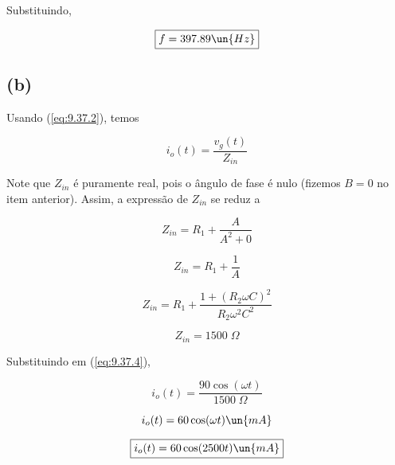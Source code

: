 Substituindo,

\[ \boxed{f = 397.89 \un{Hz}}  \]

\subsection*{(b)}

Usando (\ref{eq:9.37.2}), temos

\begin{equation}\label{eq:9.37.4}
    i_o(t) = \frac{v_g(t)}{Z_{in}}
\end{equation}

Note que $Z_{in}$ é puramente real, pois o ângulo de fase é nulo (fizemos $B = 0$ no item anterior). Assim, a expressão de 
$Z_{in}$ se reduz a 

\[ Z_{in} = R_1 + \frac{A}{A^2 + 0} \]

\[ Z_{in} = R_1 + \frac{1}{A} \]

\[ Z_{in} = R_1 + \frac{1 + (R_2\omega C)^2}{R_2\omega^2C^2} \]

\[ Z_{in} = 1500 \; \Omega \]

Substituindo em (\ref{eq:9.37.4}),

\[ i_o(t) = \frac{90\cos(\omega t)}{1500 \; \Omega} \]

\[ i_o(t) = 60\cos(\omega t) \un{mA} \]

\[ \boxed{i_o(t) = 60\cos(2500 t) \un{mA}}  \]












